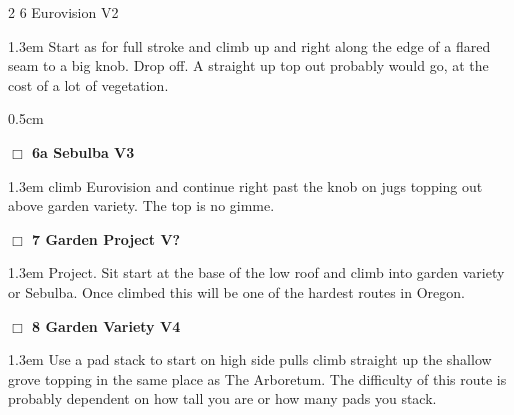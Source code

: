 \begin{multicols}{2}
{{{6 Eurovision V2  
}}}
\begin{adjustwidth}{1.3em}{}			
Start as for full stroke and climb up and right along the edge of a flared seam to a big knob. Drop off. A straight up top out probably would go, at the cost of a lot of vegetation.
\end{adjustwidth}
\begin{adjustwidth}{0.5cm}{}				
\needspace{4em}
\needspace{2em}
\label{vr:Sebulba}
\colorbox{green!20}{
\parbox{0.95\linewidth}{
\hspace{-1ex}\textbf{$\Box$
6a Sebulba V3  \warn
}}}
\begin{adjustwidth}{1.3em}{}			
climb Eurovision and continue right past the knob on jugs topping out above garden variety. The top is no gimme.
\end{adjustwidth}
\end{adjustwidth}
\needspace{2em}
\label{rt:Garden Project}
\colorbox{black!20}{
\parbox{0.95\linewidth}{
\hspace{-1ex}\textbf{$\Box$
7 Garden Project V?  
}}}
\begin{adjustwidth}{1.3em}{}			
Project. Sit start at the base of the low roof and climb into garden variety or Sebulba. Once climbed this will be one of the hardest routes in Oregon.
\end{adjustwidth}
\needspace{2em}
\label{rt:Garden Variety}
\colorbox{RoyalBlue!20}{
\parbox{0.95\linewidth}{
\hspace{-1ex}\textbf{$\Box$
8 Garden Variety V4  
}}}
\begin{adjustwidth}{1.3em}{}			
Use a pad stack to start on high side pulls climb straight up the shallow grove topping in the same place as The Arboretum. The difficulty of this route is probably dependent on how tall you are or how many pads you stack.
\end{adjustwidth}
	\end{multicols}
\label{tp:arboretum2}
  \begin{landscape}
	
  \end{landscape}
